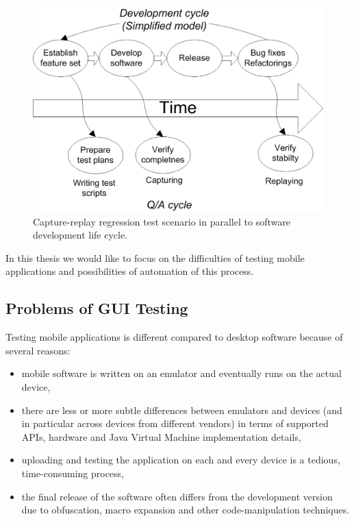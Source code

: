 \begin{figure}[t]%
\begin{center}
\includegraphics[width=.9\linewidth]{figures/process-outline-2}
\end{center}
\caption{Capture-replay regression test scenario in parallel to software development life cycle.}%
\label{fig:process-outline-2}
\end{figure}

In this thesis we would like to focus on the difficulties of testing mobile applications and possibilities of
automation of this process.  


\subsection{Problems of GUI Testing}

Testing mobile applications is different compared to desktop software because of several
reasons:

\begin{itemize}
    \item mobile software is written on an emulator and eventually runs on the actual device,

    \item there are less or more subtle differences between emulators and devices (and in particular across devices from different
    vendors) in terms of supported APIs, hardware and Java Virtual Machine implementation details,
    
    \item uploading and testing the application on each and every device is a tedious, time-consuming process,
    
    \item the final release of the software often differs from the development version due to obfuscation, macro expansion
    and other code-manipulation techniques.
\end{itemize}

